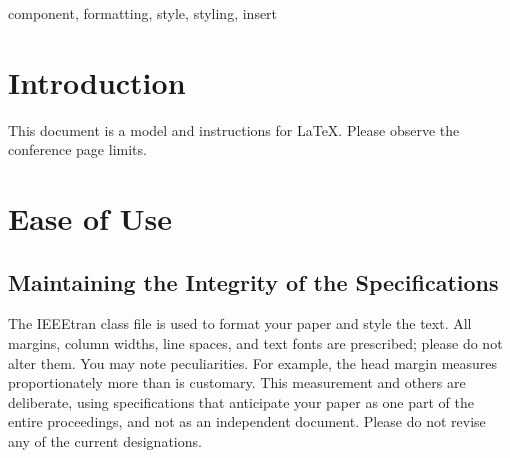 \documentclass[conference]{IEEEtran}
\begin{document}
\begin{IEEEkeywords}
component, formatting, style, styling, insert
\end{IEEEkeywords}

\section{Introduction}
This document is a model and instructions for \LaTeX.
Please observe the conference page limits. 

\section{Ease of Use}

\subsection{Maintaining the Integrity of the Specifications}

The IEEEtran class file is used to format your paper and style the text. All margins, 
column widths, line spaces, and text fonts are prescribed; please do not 
alter them. You may note peculiarities. For example, the head margin
measures proportionately more than is customary. This measurement 
and others are deliberate, using specifications that anticipate your paper 
as one part of the entire proceedings, and not as an independent document. 
Please do not revise any of the current designations.



\end{document}
